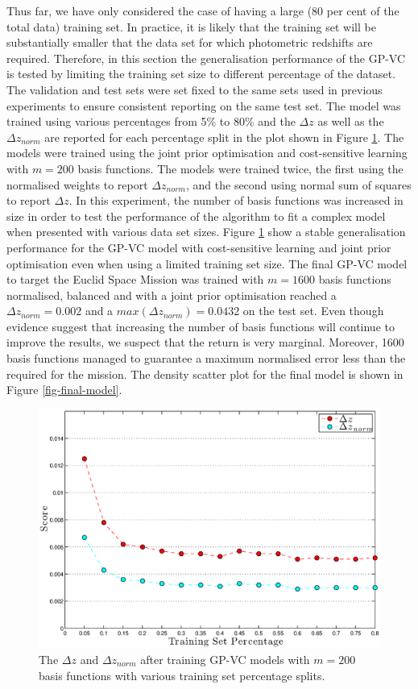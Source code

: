 \documentclass[useAMS,usenatbib,fleqn]{mn2e}
\begin{document}
Thus far, we have only considered the case of having a large (80 per cent of the total data) training set. In practice, it is likely that the training set will be substantially smaller that the data set for which photometric redshifts are required. Therefore, in this section the generalisation performance of the GP-VC is tested by limiting the training set size to different percentage of the dataset. The validation and test sets were set fixed to the same sets used in previous experiments to ensure consistent reporting on the same test set. The model was trained using various percentages from 5\% to 80\% and the $\Delta z$ as well as the $\Delta z_{norm}$ are reported for each percentage split in the plot shown in Figure \ref{fig-training-percentage}. The models were trained using the joint prior optimisation and cost-sensitive learning with $m=200$ basis functions. The models were trained twice, the first using the normalised weights to report $\Delta z_{norm}$, and the second using normal sum of squares to report $\Delta z$. In this experiment, the number of basis functions was increased in size in order to test the performance of the algorithm to fit a complex model when presented with various data set sizes. Figure \ref{fig-training-percentage} show a stable generalisation performance for the GP-VC model with cost-sensitive learning and joint prior optimisation even when using a limited training set size. The final GP-VC model to target the Euclid Space Mission was trained with $m=1600$ basis functions normalised, balanced and with a joint prior optimisation reached a $\Delta z_{norm}=0.002$ and a $max\left(\Delta z_{norm}\right)=0.0432$ on the test set. Even though evidence suggest that increasing the number of basis functions will continue to improve the results, we suspect that the return is very marginal. Moreover, 1600 basis functions managed to guarantee a maximum normalised error less than the required for the mission. The density scatter plot for the final model is shown in Figure \ref{fig-final-model}.

\begin{figure}
       \centering
        \includegraphics[width=\columnwidth]{figures/percentage.eps}
        \caption{The $\Delta z$ and $\Delta z_{norm}$ after training GP-VC models with $m=200$ basis functions with various training set percentage splits. }
       \label{fig-training-percentage}
\end{figure}
\end{document}
